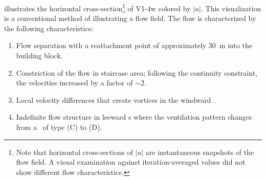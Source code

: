  illustrates the horizontal cross-section\footnote{Note that horizontal cross-sections of $|u|$ are instantaneous snapshots of the flow field. A visual examination against iteration-averaged values did not show different flow characteristics.} of V1-4w colored by $|u|$. This visualization is a conventional method of illustrating a flow field.
The flow is characterized by the following characteristics:

\begin{enumerate}[label=(\Alph*)]
	
	\item Flow separation with a reattachment point of approximately \SI{30}{m} into the building block.
	
	\item  Constriction of the flow in staircase area; following the continuity constraint,  the velocities increased by a factor of $\sim$\num{2}.
	
	\item Local velocity differences that create vortices in the windward \CR.
	
	\item  Indefinite flow structure in leeward \CR s where the ventilation pattern changes from a \CR\ of type (C) to (D).
	
\end{enumerate}





